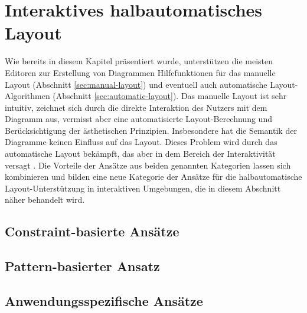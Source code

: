 
\section{Interaktives halbautomatisches Layout}
\label{sec:interactive-user-controlled-layout}

Wie bereits in diesem Kapitel präsentiert wurde, unterstützen die meisten Editoren zur Erstellung von Diagrammen Hilfefunktionen für das manuelle Layout (Abschnitt \ref{sec:manual-layout}) und eventuell auch automatische Layout-Algorithmen (Abschnitt \ref{sec:automatic-layout}). Das manuelle Layout ist sehr intuitiv, zeichnet sich durch die direkte Interaktion des Nutzers mit dem Diagramm aus, vermisst aber eine automatisierte Layout-Berechnung und Berücksichtigung der ästhetischen Prinzipien. Insbesondere hat die Semantik der Diagramme keinen Einfluss auf das Layout. Dieses Problem wird durch das automatische Layout bekämpft, das aber in dem Bereich der Interaktivität versagt \cite{GladischSchumann14Semi-Automatic}. Die Vorteile der Ansätze aus beiden genannten Kategorien lassen sich kombinieren und bilden eine neue Kategorie der Ansätze für die halbautomatische Layout-Unterstützung in interaktiven Umgebungen, die in diesem Abschnitt näher behandelt wird.




\subsection{Constraint-basierte Ansätze}


\subsection{Pattern-basierter Ansatz}


\subsection{Anwendungsspezifische Ansätze}

